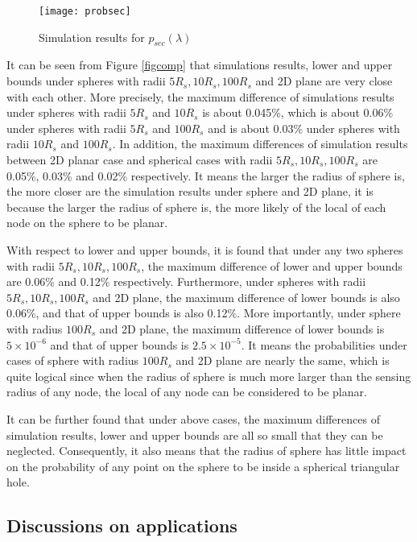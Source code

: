 \documentclass[journal, twoside]{IEEEtran}
\begin{document}
\begin{figure}[!ht]
  \centering
  \texttt{[image: probsec]}
  \caption{Simulation results for $p_{sec}(\lambda)$ }
  \label{figprobsec}
\end{figure}

It can be seen from Figure \ref{figcomp} that simulations results, lower and upper
bounds under spheres with radii $5 R_s, 10 R_s, 100 R_s$ and 2D plane are 
very close with each other. More precisely, the maximum difference of simulations results
under spheres with radii $5 R_s$ and $10 R_s$ is about 0.045\%, which is about 0.06\%
under spheres with radii $5 R_s$ and $100 R_s$ and is about 0.03\% under spheres
with radii $10 R_s$ and $100 R_s$. In addition, the maximum differences of simulation
results between 2D planar case and spherical cases with radii $5 R_s, 10 R_s, 100 R_s$
are 0.05\%, 0.03\% and 0.02\% respectively. It means the larger the radius of sphere is,
the more closer are the simulation results under sphere and 2D plane, it is because
the larger the radius of sphere is, the more likely of the local of each node on the sphere
to be planar.

With respect to lower and upper bounds, it is found that under any two 
spheres with radii $5 R_s, 10 R_s, 100 R_s$, the maximum difference of
lower and upper bounds are 0.06\% and 0.12\%  respectively. Furthermore,
under spheres with radii $5 R_s, 10 R_s, 100 R_s$ and 2D plane, 
the maximum difference of lower bounds is also 0.06\%, and that of upper bounds
is also 0.12\%. More importantly, under sphere with radius $100 R_s$ and 2D plane,
the maximum difference of lower bounds is $5 \times 10^{-6}$ and that of
upper bounds is $2.5 \times 10^{-5}$. It means the probabilities under cases of sphere with radius
$100 R_s$ and 2D plane are nearly the same, which is quite logical since when
the radius of sphere is much more larger than the sensing radius of any node,
the local of any node can be considered to be planar.

It can be further found that under above cases, the maximum differences of simulation results,
lower and upper bounds are all so small that they can be neglected. Consequently,
it also means that the radius of sphere has little impact on the probability of any 
point on the sphere to be inside a spherical triangular hole. 

\subsection{Discussions on applications} \label{discussion}
\end{document}
